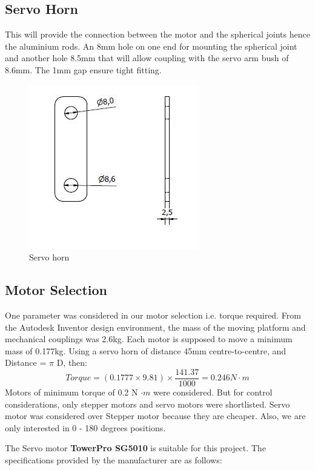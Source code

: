 \subsection{Servo Horn}
This will provide the connection between the motor and the spherical joints hence the aluminium rods. An 8mm hole on one end for mounting the spherical joint and another hole 8.5mm that will allow coupling with the servo arm bush of 8.6mm. The 1mm gap ensure tight fitting.
\begin{center}
	\begin{figure}[H]
	\centering
	\includegraphics[width=0.6\linewidth]{Figures/Horn}
	\caption{Servo horn}
	\end{figure}
\end{center}

\subsection{Motor Selection}
One parameter was considered in our motor selection i.e. torque required. From the Autodesk Inventor design environment, the mass of the moving platform and mechanical couplings was 2.6kg. Each motor is supposed to move a minimum mass of 0.177kg. Using a servo horn of distance 45mm centre-to-centre, and Distance = $ \pi $ D, then:
\begin{equation}
Torque = (0.1777 \times 9.81)\times \frac{141.37}{1000} = 0.246 N\cdot m
\end{equation}
Motors of minimum torque of 0.2 N $\cdot m$ were considered. But for control considerations, only stepper motors and servo motors were shortlisted. Servo motor was considered over Stepper motor because they are cheaper. Also, we are only interested in 0 - 180 degrees positions.

The Servo motor \textbf{TowerPro SG5010} is suitable for this project. The specifications provided by the manufacturer are as follows:


